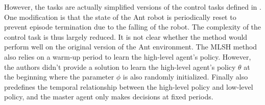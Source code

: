 However, the tasks are actually simplified versions of the control tasks defined in \cite{duan2016benchmarking}. One modification is that the state of the Ant robot is periodically reset to prevent episode termination due to the falling of the robot. The complexity of the control task is thus largely reduced. It is not clear whether the method would perform well on the original version of the Ant environment.
The MLSH method also relies on a warm-up period to learn the high-level agent's policy. However, the authors didn't provide a solution to learn the high-level agent's policy $\theta$ at the beginning where the parameter $\phi$ is also randomly initialized.
Finally also predefines the temporal relationship between the high-level policy and low-level policy, and the master agent only makes decisions at fixed periods.
